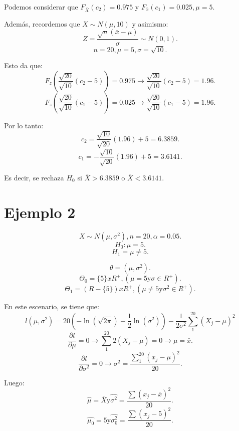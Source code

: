 \documentclass{article}
\begin{document}
Podemos considerar que $F_{\bar{X}}(c_{2})=0.975$ y $F_{\bar{x}}(c_{1})=0.025, \mu=5$.

Además, recordemos que $X\sim N(\mu,10)$ y asimismo:
\[Z = \frac{\sqrt{n}(\bar{x}-\mu)}{\sigma}\sim N(0,1).\]
\[n=20,\mu=5,\sigma=\sqrt{10}.\]

Esto da que:
\[F_{z}(\frac{\sqrt{20}}{\sqrt{10}}(c_{2}-5))=0.975 \rightarrow \frac{\sqrt{20}}{\sqrt{10}}(c_{2}-5)=1.96.\]
\[F_{z}(\frac{\sqrt{20}}{\sqrt{10}}(c_{1}-5))=0.025 \rightarrow \frac{\sqrt{20}}{\sqrt{10}}(c_{1}-5)=1.96.\]

Por lo tanto:
\[c_{2}=\frac{\sqrt{10}}{\sqrt{20}}(1.96)+5=6.3859.\]
\[c_{1}=-\frac{\sqrt{10}}{\sqrt{20}}(1.96)+5=3.6141.\]

Es decir, se rechaza $H_{0}$ si $\bar{X}>6.3859$ o $\bar{X}<3.6141$.

\section{Ejemplo 2}
\[X\sim N(\mu,\sigma^{2}), n=20, \alpha=0.05.\]
\[H_{0}:\mu=5.\]
\[H_{1}=\mu\neq 5.\]

\[\theta=(\mu,\sigma^{2}).\]
\[\Theta_{0}=\{5\}x R^{+}, (\mu=5 \text{y} \sigma \in R^{+}).\]
\[\Theta_{1}=(R-\{5\})x R^{+}, (\mu \neq 5 \text{y} \sigma^{2} \in R^{+}).\]

En este escenario, se tiene que:
\[l(\mu,\sigma^{2})=20(-\ln(\sqrt{2\pi})-\frac{1}{2}\ln(\sigma^{2}))-\frac{1}{2\sigma^{2}}\sum_{1}^{20}{(X_{j}-\mu)}^{2}\]
\[\frac{\partial{l}}{\partial{\mu}}=0 \rightarrow \sum_{1}^{20}2{(X_{j}-\mu)}=0 \rightarrow \mu=\bar{x}.\]
\[\frac{\partial{l}}{\partial{\sigma^{2}}}=0 \rightarrow \sigma^{2}=\frac{\sum_{1}^{20}{(x_{j}-\mu)}^{2}}{20}.\]

Luego:
\[\hat{\mu}=\bar{X} \text{y} \hat{\sigma^{2}}=\frac{\sum{(x_{j}-\bar{x})}^{2}}{20}.\]
\[\hat{\mu_{0}}=5 \text{y} \hat{\sigma^{2}_{0}}=\frac{\sum{(x_{j}-5)}^{2}}{20}.\]
\end{document}
